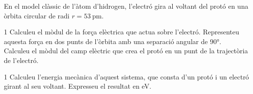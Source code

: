 En el model clàssic de l'àtom d'hidrogen, l'electró gira al voltant del protó en una òrbita circular de radi $r = 53\ \mathrm{pm}$.

\begin{apartat}{1}
Calculeu el mòdul de la força elèctrica que actua sobre l'electró. Representeu aquesta força en dos punts de l'òrbita amb una separació angular de 90°. Calculeu el mòdul del camp elèctric que crea el protó en un punt de la trajectòria de l'electró.
\end{apartat}

\begin{apartat}{1}
Calculeu l'energia mecànica d'aquest sistema, que consta d'un protó i un electró girant al seu voltant. Expresseu el resultat en eV.
\end{apartat}

